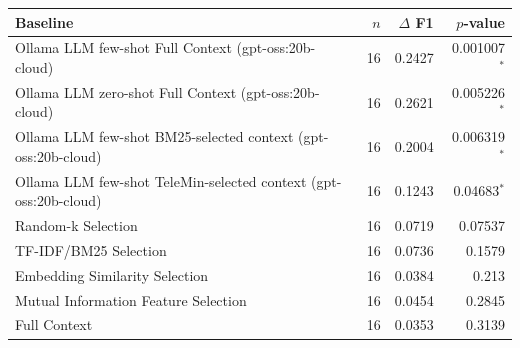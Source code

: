 \begin{tabular}{lrrr}
\toprule
Baseline & $n$ & $\Delta$ F1 & $p$-value \\
\midrule
Ollama LLM few-shot Full Context (gpt-oss:20b-cloud) & 16 & 0.2427 & 0.001007$^*$ \\
Ollama LLM zero-shot Full Context (gpt-oss:20b-cloud) & 16 & 0.2621 & 0.005226$^*$ \\
Ollama LLM few-shot BM25-selected context (gpt-oss:20b-cloud) & 16 & 0.2004 & 0.006319$^*$ \\
Ollama LLM few-shot TeleMin-selected context (gpt-oss:20b-cloud) & 16 & 0.1243 & 0.04683$^*$ \\
Random-k Selection & 16 & 0.0719 & 0.07537 \\
TF-IDF/BM25 Selection & 16 & 0.0736 & 0.1579 \\
Embedding Similarity Selection & 16 & 0.0384 & 0.213 \\
Mutual Information Feature Selection & 16 & 0.0454 & 0.2845 \\
Full Context & 16 & 0.0353 & 0.3139 \\
\bottomrule
\end{tabular}
